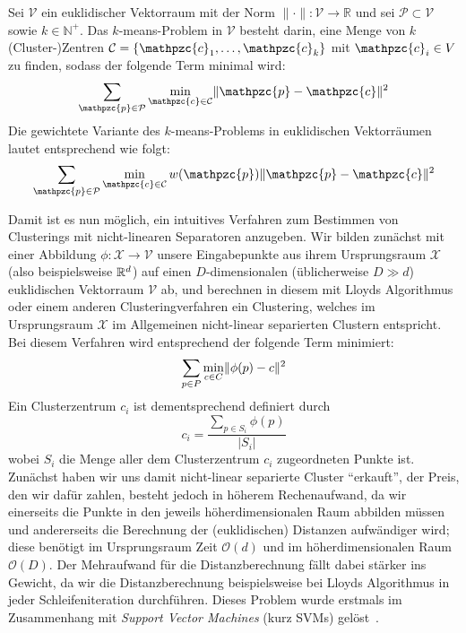 \begin{definition}
\label{def:kmeans-kmedian-innerproduct}
Sei $\mathcal{V}$ ein euklidischer Vektorraum mit der Norm $\lVert \cdot \rVert : \mathcal{V} \rightarrow \mathbb{R}$
und sei $\mathcal{P} \subset \mathcal{V}$ sowie $k \in \mathbb{N}^{+}$.
Das $k$-means-Problem in $\mathcal{V}$ besteht darin, eine Menge von $k$ (Cluster-)Zentren
$\mathcal{C} = \{ \mathpzc{c}_1, \dots, \mathpzc{c}_k \}$ mit $\mathpzc{c}_i \in V$ zu finden, sodass der folgende Term
minimal wird:
\[ \sum_{\mathpzc{p} \in \mathcal{P}} \min_{\mathpzc{c} \in \mathcal{C}} \EuclidSquared{\mathpzc{p}}{\mathpzc{c}} \]
Die gewichtete Variante des $k$-means-Problems in euklidischen Vektorräumen lautet entsprechend wie folgt:
\[ \sum_{\mathpzc{p} \in \mathcal{P}} \min_{\mathpzc{c} \in \mathcal{C}} w(\mathpzc{p})
	\EuclidSquared{\mathpzc{p}}{\mathpzc{c}} \]
\end{definition}
Damit ist es nun möglich, ein intuitives Verfahren zum Bestimmen von Clusterings mit nicht-linearen Separatoren anzugeben.
Wir bilden zunächst mit einer Abbildung $\phi : \mathcal{X} \rightarrow \mathcal{V}$ unsere Eingabepunkte aus ihrem Ursprungsraum
$\mathcal{X}$ (also beispielsweise $\mathbb{R}^{d}$) auf einen $D$-dimensionalen (üblicherweise $D \gg d$) euklidischen
Vektorraum $\mathcal{V}$ ab, und berechnen in diesem mit Lloyds Algorithmus oder einem anderen Clusteringverfahren ein
Clustering, welches im Ursprungsraum $\mathcal{X}$ im Allgemeinen nicht-linear separierten Clustern entspricht.
Bei diesem Verfahren wird entsprechend der folgende Term minimiert:
\[ \sum_{p \in P} \min_{c \in C} \lVert {\phi(p)} - {c} \rVert^2 \]
Ein Clusterzentrum $c_i$ ist dementsprechend definiert durch
\[ c_i = \frac{\sum_{p \in S_i} \phi(p)}{\left|S_i\right|} \]
wobei $S_i$ die Menge aller dem Clusterzentrum $c_i$ zugeordneten Punkte ist. Zunächst haben wir uns damit nicht-linear separierte
Cluster "`erkauft"', der Preis, den wir dafür zahlen, besteht jedoch in höherem Rechenaufwand, da wir einerseits die Punkte
in den jeweils höherdimensionalen Raum abbilden müssen und andererseits die Berechnung der (euklidischen) Distanzen aufwändiger
wird; diese benötigt im Ursprungsraum Zeit $\mathcal{O}(d)$ und im höherdimensionalen Raum $\mathcal{O}(D)$. Der Mehraufwand
für die Distanzberechnung fällt dabei stärker ins Gewicht, da wir die Distanzberechnung beispielsweise bei Lloyds Algorithmus
in jeder Schleifeniteration durchführen.
\absatz
Dieses Problem wurde erstmals im Zusammenhang mit \emph{Support Vector Machines} (kurz SVMs) gelöst~\cite{BoserGV92}.
